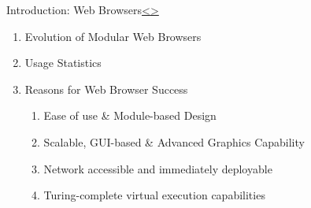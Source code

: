 \documentclass[12pt]{extarticle}
\newenvironment{instructionblock}{\Large\bgroup}{\egroup}
\begin{document}
	\pagebreak		
	\begin{slide}{Introduction: Web Browsers}{\hyperref[slide 3]{\textless}\hyperref[slide 5]{\textgreater}}
		\begin{instructionblock}
			\begin{enumerate}
				\item {Evolution of Modular Web Browsers}
				\item {Usage Statistics}
				\item {Reasons for Web Browser Success}
				\begin{enumerate}
					\item Ease of use \& Module-based Design 
					\item Scalable, GUI-based \& Advanced Graphics Capability
					\item Network accessible and immediately deployable
					\item Turing-complete virtual execution capabilities
				\end{enumerate}
			\end{enumerate}
		\end{instructionblock}
	\end{slide}
	
\end{document}
